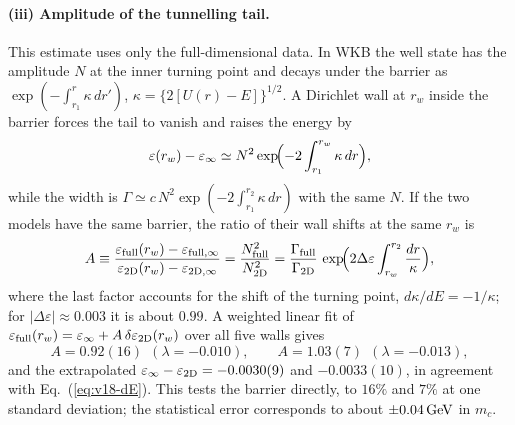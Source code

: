 \paragraph{(iii) Amplitude of the tunnelling tail.}\label{sec:v18-tail}
This estimate uses only the full-dimensional data.
In WKB the well state has the amplitude $N$ at the inner turning point and decays under the barrier as $\exp(-\int_{r_1}^{r}\kappa\,dr')$, $\kappa=\{2[U(r)-E]\}^{1/2}$.
A Dirichlet wall at $r_w$ inside the barrier forces the tail to vanish and raises the energy by
\begin{equation}
\varepsilon(r_w)-\varepsilon_\infty\simeq N^2\exp\!\Bigl(-2\int_{r_1}^{r_w}\kappa\,dr\Bigr),
\label{eq:v18-wallshift}
\end{equation}
while the width is $\Gamma\simeq c\,N^2\exp(-2\int_{r_1}^{r_2}\kappa\,dr)$ with the same $N$.
If the two models have the same barrier, the ratio of their wall shifts at the same $r_w$ is
\begin{equation}
A\equiv\frac{\varepsilon_{\rm full}(r_w)-\varepsilon_{\rm full,\infty}}{\varepsilon_{\rm 2D}(r_w)-\varepsilon_{\rm 2D,\infty}}=\frac{N_{\rm full}^2}{N_{\rm 2D}^2}=\frac{\Gamma_{\rm full}}{\Gamma_{\rm 2D}}\,\exp\!\Bigl(2\Delta\varepsilon\int_{r_w}^{r_2}\frac{dr}{\kappa}\Bigr),
\label{eq:v18-A}
\end{equation}
where the last factor accounts for the shift of the turning point, $d\kappa/dE=-1/\kappa$; for $|\Delta\varepsilon|\approx0.003$ it is about $0.99$. %
A weighted linear fit of $\varepsilon_{\rm full}(r_w)=\varepsilon_\infty+A\,\delta\varepsilon_{\rm 2D}(r_w)$ over all five walls gives
\begin{equation}
A=0.92(16)\ \ (\lambda=-0.010),\qquad A=1.03(7)\ \ (\lambda=-0.013),
\label{eq:v18-Afit}
\end{equation}
and the extrapolated $\varepsilon_\infty-\varepsilon_{\rm 2D}=-0.0030(9)$ and $-0.0033(10)$, in agreement with Eq.~(\ref{eq:v18-dE}). %
This tests the barrier directly, to $16\%$ and $7\%$ at one standard deviation; the statistical error corresponds to about $\pm0.04\,\mathrm{GeV}$ in $m_c$. %

